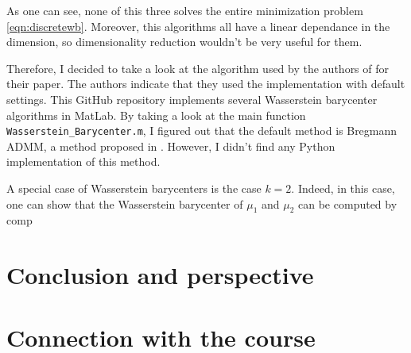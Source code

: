 \documentclass[11pt,a4paper]{article}
\begin{document}
As one can see, none of this three solves the entire minimization problem \ref{eqn:discretewb}. Moreover, this algorithms all have a linear dependance in the dimension, so dimensionality reduction wouldn't be very useful for them.

Therefore, I decided to take a look at the algorithm used by the authors of \cite{izzo_dimensionality_2021} for their paper. The authors indicate that they used the implementation \cite{ye_efficient_2022} with default settings. This GitHub repository implements several Wasserstein barycenter algorithms in MatLab. By taking a look at the main function \verb|Wasserstein_Barycenter.m|, I figured out that the default method is Bregmann ADMM, a method proposed in \cite{ye_fast_2017}. However, I didn't find any Python implementation of this method.

A special case of Wasserstein barycenters is the case $k=2$. Indeed, in this case, one can show that the Wasserstein barycenter of $\mu_1$ and $\mu_2$ can be computed by comp

\section{Conclusion and perspective}

\section{Connection with the course}

\printbibliography
\end{document}
